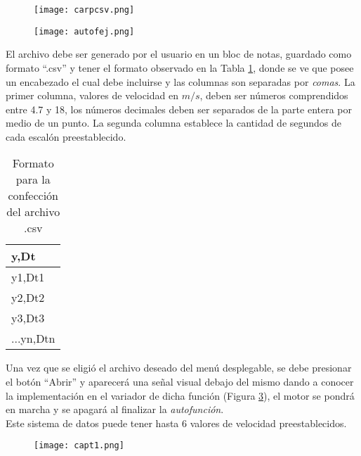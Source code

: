\begin{figure}[H]
	\centering
	\texttt{[image: carpcsv.png]}
	\label{fig:autof2}
\end{figure}

\begin{figure}[H]
	\centering
	\texttt{[image: autofej.png]}
	\label{fig:autof22}
\end{figure}

El archivo debe ser generado por el usuario en un bloc de notas, guardado como formato  ``.csv'' y tener el formato observado en la Tabla \ref{tab:formcsv}, donde se ve que posee un encabezado el cual debe incluirse y las columnas son separadas por \textit{comas}. La primer columna, valores de velocidad en $m/s$, deben ser números comprendidos entre 4.7 y 18, los números decimales deben ser separados de la parte entera por medio de un punto. La segunda columna establece la cantidad de segundos de cada escalón preestablecido.
\begin{table}[h]
	\centering
	\begin{tabular}{|l|}
		\hline
		y,Dt \\ \hline
		y1,Dt1 \\ \hline
		y2,Dt2 \\ \hline
		y3,Dt3 \\ \hline
		...yn,Dtn \\ \hline
	\end{tabular}
	
	\caption{Formato para la confección del archivo .csv}
	\label{tab:formcsv}
\end{table}


Una vez que se eligió el archivo deseado del menú desplegable, se debe presionar el botón ``Abrir'' y aparecerá una señal visual debajo del mismo dando a conocer la implementación en el variador de dicha función (Figura \ref{fig:autof1}), el motor se pondrá en marcha y se apagará al finalizar la \textit{autofunción}.\\
Este sistema de datos puede tener hasta 6 valores de velocidad preestablecidos.

\begin{figure}[htb]
	\centering
	\texttt{[image: capt1.png]}
	\label{fig:autof1}
\end{figure}





